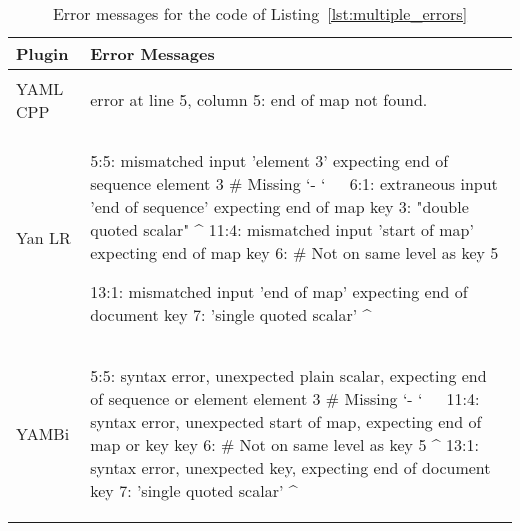 \begin{table}[H]
  \caption{Error messages for the  code of Listing~\ref{lst:multiple_errors}}
  \label{tab:error_messages_final_multiple_errors}
  \centering

  \begin{adjustbox}{max width=\textwidth}
  \begin{tabular}{lp{}}
    \toprule
    Plugin & Error Messages\\
    \midrule

    \vspace{0cm}
    YAML CPP &
    \vspace{-0.36cm}
    \begin{textcode}
      error at line 5, column 5: end of map not found.
    \end{textcode}
    \\

    \vspace{0cm}
    Yan LR &
    \vspace{-0.36cm}
    \begin{textcode}
      5:5: mismatched input 'element 3' expecting end of sequence
               element 3 # Missing `- `
               ^^^^^^^^^
      6:1: extraneous input 'end of sequence' expecting end of map
           key 3: "double quoted scalar"
           ^
      11:4: mismatched input 'start of map' expecting end of map
               key 6: # Not on same level as key 5

      13:1: mismatched input 'end of map' expecting end of document
            key 7: 'single quoted scalar'
            ^
    \end{textcode}
    \\

    \vspace{0cm}
    YAMBi &
    \vspace{-0.36cm}
    \begin{textcode}
      5:5: syntax error, unexpected plain scalar,
           expecting end of sequence or element
               element 3 # Missing `- `
               ^^^^^^^^^
      11:4: syntax error, unexpected start of map,
            expecting end of map or key
               key 6: # Not on same level as key 5
               ^
      13:1: syntax error, unexpected key, expecting end of document
            key 7: 'single quoted scalar'
            ^
    \end{textcode}
    \\


\end{tabular}
\end{adjustbox}
\end{table}

